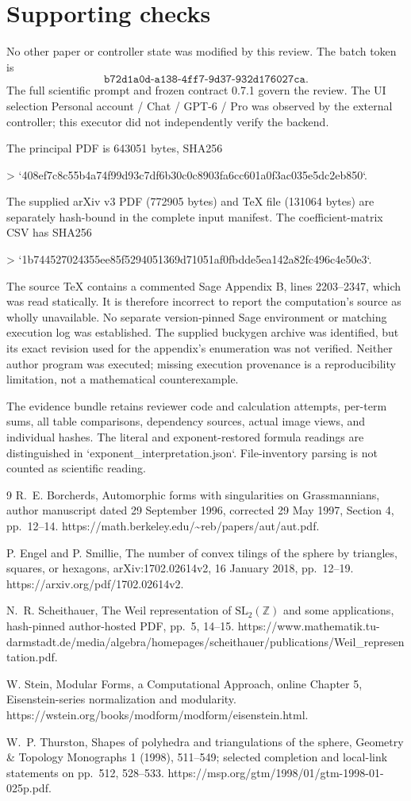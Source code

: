 \documentclass[10pt]{article}
\begin{document}
\section*{Supporting checks}
No other paper or controller state was modified by this review. The batch token is \[\texttt{b72d1a0d-a138-4ff7-9d37-932d176027ca}.\] The full scientific prompt and frozen contract 0.7.1 govern the review. The UI selection Personal account / Chat / GPT-6 / Pro was observed by the external controller; this executor did not independently verify the backend.\par
The principal PDF is 643051 bytes, SHA256\par
> `408ef7c8c55b4a74f99d93c7df6b30c0c8903fa6cc601a0f3ac035e5dc2eb850`.\par
The supplied arXiv v3 PDF (772905 bytes) and TeX file (131064 bytes) are separately hash-bound in the complete input manifest. The coefficient-matrix CSV has SHA256\par
> `1b744527024355ee85f5294051369d71051af0fbdde5ea142a82fc496c4e50e3`.\par
The source TeX contains a commented Sage Appendix B, lines 2203–2347, which was read statically. It is therefore incorrect to report the computation’s source as wholly unavailable. No separate version-pinned Sage environment or matching execution log was established. The supplied buckygen archive was identified, but its exact revision used for the appendix’s enumeration was not verified. Neither author program was executed; missing execution provenance is a reproducibility limitation, not a mathematical counterexample.\par
The evidence bundle retains reviewer code and calculation attempts, per-term sums, all table comparisons, dependency sources, actual image views, and individual hashes. The literal and exponent-restored formula readings are distinguished in `exponent\_interpretation.json`. File-inventory parsing is not counted as scientific reading.\par
9 R. E. Borcherds, Automorphic forms with singularities on Grassmannians, author manuscript dated 29 September 1996, corrected 29 May 1997, Section 4, pp. 12–14. https://math.berkeley.edu/\textasciitilde{}reb/papers/aut/aut.pdf.\par
P. Engel and P. Smillie, The number of convex tilings of the sphere by triangles, squares, or hexagons, arXiv:1702.02614v2, 16 January 2018, pp. 12–19. https://arxiv.org/pdf/1702.02614v2.\par
N. R. Scheithauer, The Weil representation of \(\mathrm{SL}_2(\mathbb Z)\) and some applications, hash-pinned author-hosted PDF, pp. 5, 14–15. https://www.mathematik.tu-darmstadt.de/media/algebra/homepages/scheithauer/publications/Weil\_representation.pdf.\par
W. Stein, Modular Forms, a Computational Approach, online Chapter 5, Eisenstein-series normalization and modularity. https://wstein.org/books/modform/modform/eisenstein.html.\par
W. P. Thurston, Shapes of polyhedra and triangulations of the sphere, Geometry \& Topology Monographs 1 (1998), 511–549; selected completion and local-link statements on pp. 512, 528–533. https://msp.org/gtm/1998/01/gtm-1998-01-025p.pdf.\par
\end{document}
